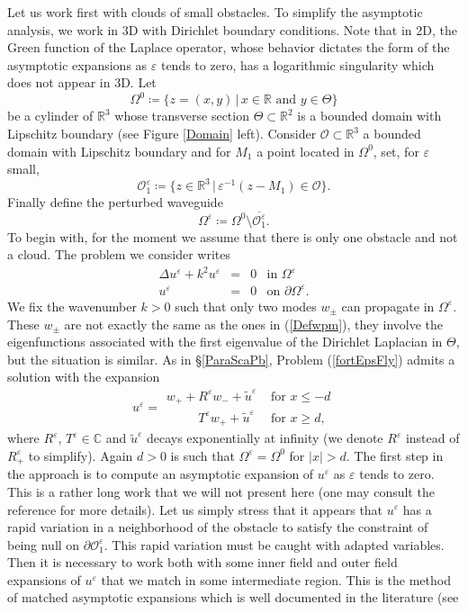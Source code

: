 \documentclass[11pt,a4paper]{report}
\newcommand{\eps}{\varepsilon}
\newcommand{\Om}{\Omega}
\newcommand{\Cplx}{\mathbb{C}}
\newcommand{\R}{\mathbb{R}}
\begin{document}
\noindent Let us work first with clouds of small obstacles. To simplify the asymptotic analysis, we  work in 3D with Dirichlet boundary conditions. Note that in 2D, the Green function of the Laplace operator, whose behavior dictates the form of the asymptotic expansions as $\eps$ tends to zero, has a logarithmic singularity which does not appear in 3D. Let 
\[
\Om^0\coloneqq\{z=(x,y)\,|\,x\in\R\mbox{ and }y\in\Theta\}
\]
be a cylinder of $\R^3$ whose transverse section $\Theta\subset\R^2$ is a bounded domain with Lipschitz boundary (see Figure \ref{Domain} left). Consider $\mathcal{O}\subset\R^3$ a bounded domain with Lipschitz boundary and for $M_1$ a point located in $\Om^0$, set, for $\eps$ small,
\[
\mathcal{O}^\eps_1\coloneqq\{z\in\R^3\,|\,\eps^{-1}(z-M_1)\in\mathcal{O}\}.
\]
Finally define the perturbed waveguide 
\[
\Om^\eps\coloneqq\Om^0\setminus\overline{\mathcal{O}^\eps_1}.
\] 
To begin with, for the moment we assume that there is only one obstacle and not a cloud. The problem we consider writes
\begin{equation} \label{fortEpsFly} 
\begin{array}{|rccl}
\Delta u^\eps + k^2u^\eps &=& 0&  \mbox{in }\Om^\eps\\[3pt]
 u^\eps&=&0 & \mbox{on } \partial\Om^\eps.
\end{array}	
\end{equation}
We fix the wavenumber $k>0$ such that only two modes $w_\pm$ can propagate in $\Om^\eps$. These $w_\pm$ are not exactly the same as the ones in (\ref{Defwpm}), they involve the eigenfunctions associated with the first eigenvalue of the Dirichlet Laplacian in $\Theta$, but the situation is similar. As in \S\ref{ParaScaPb}, Problem (\ref{fortEpsFly}) admits a solution with the expansion
\[
u^\eps=\begin{array}{|ll}
w_++R^\eps w_-+\tilde{u}^\eps & \mbox{ for }x\le - d \\[3pt]
\phantom{w_+mi}T^\eps w_++\tilde{u}^\eps & \mbox{ for }x\ge d,
\end{array}
\]
where $R^\eps$, $T^\eps\in\Cplx$ and $\tilde{u}^\eps$ decays exponentially at infinity (we denote $R^\eps$ instead of $R^\eps_+$ to simplify). Again $d>0$ is such that $\Om^\eps=\Om^0$ for $|x|>d$. The first step in the approach is to compute an asymptotic expansion of $u^\eps$ as $\eps$ tends to zero. This is a rather long work that we will not present here (one may consult the  reference \cite[\S2.2]{MaNP00} for more details). Let us simply stress that it appears that $u^\eps$ has a rapid variation in a neighborhood of the obstacle to satisfy the constraint of being null on $\partial\mathcal{O}^\eps_1$. This rapid variation must be caught with adapted variables. Then it is necessary to work both with some inner field and outer field expansions of $u^\eps$ that we match in some intermediate region. This is the method of matched asymptotic expansions which is well documented in the literature (see
\end{document}
